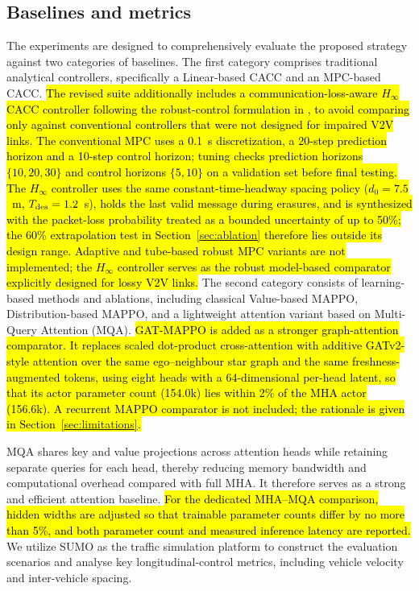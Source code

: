 \documentclass{ieeeaccess}
\begin{document}
\subsection{Baselines and metrics}
The experiments are designed to comprehensively evaluate the proposed strategy against two categories of baselines. The first category comprises traditional analytical controllers, specifically a Linear-based CACC and an MPC-based CACC. \hl{The revised suite additionally includes a communication-loss-aware $H_\infty$ CACC controller following the robust-control formulation in \cite{YANG2025103212}, to avoid comparing only against conventional controllers that were not designed for impaired V2V links. The conventional MPC uses a 0.1~s discretization, a 20-step prediction horizon and a 10-step control horizon; tuning checks prediction horizons $\{10,20,30\}$ and control horizons $\{5,10\}$ on a validation set before final testing.} %
\hl{The $H_\infty$ controller uses the same constant-time-headway spacing policy ($d_0=7.5$~m, $T_{\rm des}=1.2$~s), holds the last valid message during erasures, and is synthesized with the packet-loss probability treated as a bounded uncertainty of up to 50\%; the 60\% extrapolation test in Section~\ref{sec:ablation} therefore lies outside its design range. Adaptive and tube-based robust MPC variants are not implemented; the $H_\infty$ controller serves as the robust model-based comparator explicitly designed for lossy V2V links.} %
The second category consists of learning-based methods and ablations, including classical Value-based MAPPO, Distribution-based MAPPO, and a lightweight attention variant based on Multi-Query Attention (MQA). \hl{GAT-MAPPO is added as a stronger graph-attention comparator. It replaces scaled dot-product cross-attention with additive GATv2-style attention over the same ego--neighbour star graph and the same freshness-augmented tokens, using eight heads with a 64-dimensional per-head latent, so that its actor parameter count (154.0k) lies within 2\% of the MHA actor (156.6k). A recurrent MAPPO comparator is not included; the rationale is given in Section~\ref{sec:limitations}.} %

MQA shares key and value projections across attention heads while retaining separate queries for each head, thereby reducing memory bandwidth and computational overhead compared with full MHA. It therefore serves as a strong and efficient attention baseline. \hl{For the dedicated MHA--MQA comparison, hidden widths are adjusted so that trainable parameter counts differ by no more than 5\%, and both parameter count and measured inference latency are reported.} %
We utilize SUMO as the traffic simulation platform to construct the evaluation scenarios and analyse key longitudinal-control metrics, including vehicle velocity and inter-vehicle spacing.
\end{document}
